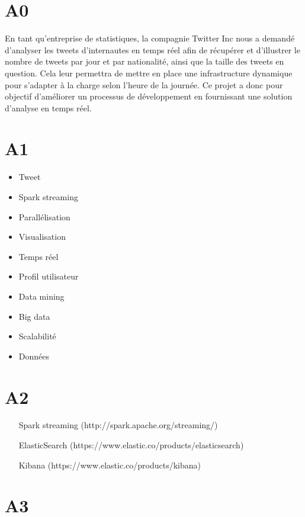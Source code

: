 \section{A0}
  En tant qu'entreprise de statistiques, la compagnie Twitter Inc nous a demandé d'analyser les tweets d'internautes en temps réel afin de récupérer et d'illustrer le nombre de tweets par jour et par nationalité, ainsi que la taille des tweets en question. Cela leur permettra de mettre en place une infrastructure dynamique pour s'adapter à la charge selon l'heure de la journée. Ce projet a donc pour objectif d'améliorer un processus de développement en fournissant une solution d'analyse en temps réel.

\section{A1}
  \begin{itemize}
    \item Tweet
    \item Spark streaming
    \item Parallélisation
    \item Visualisation
    \item Temps réel
    \item Profil utilisateur
    \item Data mining
    \item Big data
    \item Scalabilité
    \item Données
  \end{itemize}

\section{A2}
  \begin{itemize}
    \item [Spark streaming](http://spark.apache.org/streaming/)
    \item [ElasticSearch](https://www.elastic.co/products/elasticsearch)
    \item [Kibana](https://www.elastic.co/products/kibana)
  \end{itemize}

\section{A3}

